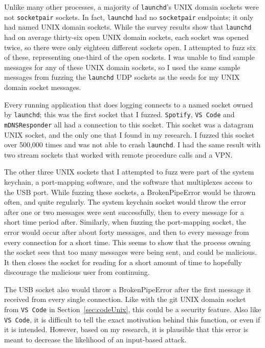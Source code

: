 Unlike many other processes, a majority of \texttt{launchd}'s UNIX domain sockets were not \texttt{socketpair} sockets.  In fact, \texttt{launchd} had no \texttt{socketpair} endpoints; it only had named UNIX domain sockets.  While the survey results show that \texttt{launchd} had on average thirty-six open UNIX domain sockets, each socket was opened twice, so there were only eighteen different sockets open.  I attempted to fuzz six of these, representing one-third of the open sockets.  I was unable to find sample messages for any of these UNIX domain sockets, so I used the same sample messages from fuzzing the \texttt{launchd} UDP sockets as the seeds for my UNIX domain socket messages.

Every running application that does logging connects to a named socket owned by \texttt{launchd}; this was the first socket that I fuzzed.  \texttt{Spotify}, \texttt{VS Code} and \texttt{mDNSResponder} all had a connection to this socket.  This socket was a datagram UNIX socket, and the only one that I found in my research.  I fuzzed this socket over 500,000 times and was not able to crash \texttt{launchd}.  I had the same result with two stream sockets that worked with remote procedure calls and a VPN.

The other three UNIX sockets that I attempted to fuzz were part of the system keychain, a port-mapping software, and the software that multiplexes access to the USB port.  While fuzzing these sockets, a BrokenPipeError would be thrown often, and quite regularly.  The system keychain socket would throw the error after one or two messages were sent successfully, then to every message for a short time period after.  Similarly, when fuzzing the port-mapping socket, the error would occur after about forty messages, and then to every message from every connection for a short time.  This seems to show that the process owning the socket sees that too many messages were being sent, and could be malicious.  It then closes the socket for reading for a short amount of time to hopefully discourage the malicious user from continuing.

The USB socket also would throw a BrokenPipeError after the first message it received from every single connection.  Like with the git UNIX domain socket from \texttt{VS Code} in Section~\ref{sec:codeUnix}, this could be a security feature.  Also like \texttt{VS Code}, it is difficult to tell the exact motivation behind this function, or even if it is intended.  However, based on my research, it is plausible that this error is meant to decrease the likelihood of an input-based attack.

